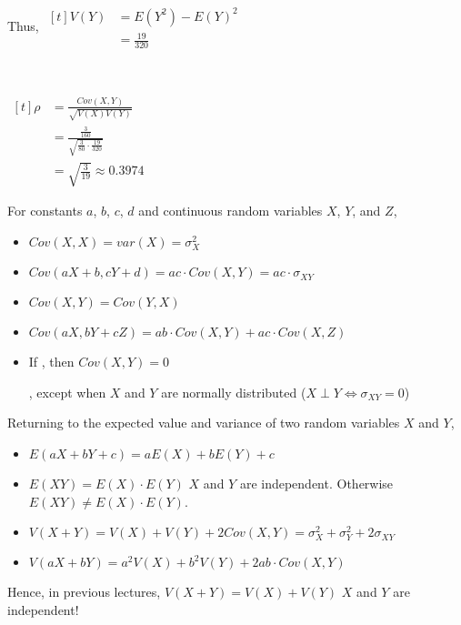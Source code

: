 \begin{example}[Count.]
\begin{enumerate}[label=\alph*)]
\begin{minipage}[t]{0.45\linewidth}
            Thus, $\begin{aligned}[t]
                V(Y) & = E(Y^2) - E(Y)^2                       \\
                     & = \frac{19}{320}
            \end{aligned}$
        \end{minipage}

        {~~~}

        $\begin{aligned}[t]
            \rho & = \frac{Cov(X, Y)}{\sqrt{V(X)V(Y)}}                              \\
                 & = \frac{\frac{3}{160}}{\sqrt{\frac{3}{80} \cdot \frac{19}{320}}} \\
                 & = \sqrt{\frac{3}{19}} \approx 0.3974
        \end{aligned}$
    \end{enumerate}
\end{example}

\begin{theorem}
    For constants $a$, $b$, $c$, $d$ and continuous random variables $X$, $Y$, and $Z$, 

    \begin{itemize}
        \item $Cov(X, X) = var(X) = \sigma_X^2$
        \item $Cov(aX + b, cY + d) = ac \cdot Cov(X, Y) = ac \cdot \sigma_{XY}$
        \item $Cov(X, Y) = Cov(Y, X)$
        \item $Cov(aX, bY + cZ) = ab \cdot Cov(X, Y) + ac \cdot Cov(X, Z)$
        \item If , then $Cov(X, Y) = 0$

        , except when $X$ and $Y$ are normally distributed ($X \perp Y \iff \sigma_{XY} = 0$)
    \end{itemize}
\end{theorem}

\begin{theorem}
    Returning to the expected value and variance of two random variables $X$ and $Y$, 

    \begin{itemize}
        \item $E(aX + bY + c) = aE(X) + bE(Y) + c$
        \item $E(XY) = E(X) \cdot E(Y)$  $X$ and $Y$ are independent. Otherwise $E(XY) \neq E(X) \cdot E(Y)$.
        \item $V(X + Y) = V(X) + V(Y) + 2Cov(X, Y) = \sigma_X^2 + \sigma_Y^2 + 2\sigma_{XY}$
        \item $V(aX + bY) = a^2V(X) + b^2V(Y) + 2ab \cdot Cov(X, Y)$
    \end{itemize}
\end{theorem}

Hence, in previous lectures, $V(X + Y) = V(X) + V(Y)$  $X$ and $Y$ are independent!